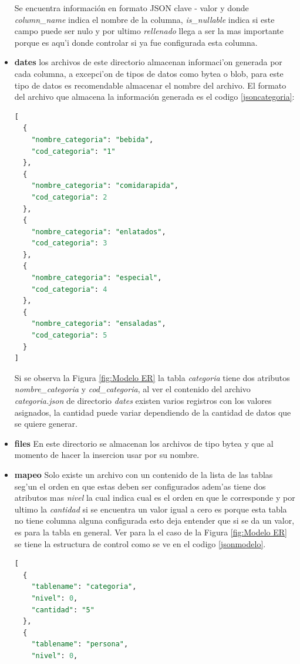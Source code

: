 \begin{itemize}
Se encuentra informaci\'on en formato JSON clave - valor y donde \textit{column\_name} indica el nombre de la columna, \textit{is\_nullable} indica si este campo puede ser nulo y por ultimo \textit{rellenado} llega a ser la mas importante porque es aqu'i donde controlar si ya fue configurada esta columna.
\item \textbf{dates} los archivos de este directorio almacenan informaci'on generada por cada columna, a excepci'on de tipos de datos como bytea o blob, para este tipo de datos es recomendable almacenar el nombre del archivo. El formato del archivo que almacena la informaci\'on generada es el codigo \ref{jsoncategoria}:
\begin{lstlisting}[caption={Ejemplo archivo control},label={jsoncategoria},language=sql]
[
  {
    "nombre_categoria": "bebida",
    "cod_categoria": "1"
  },
  {
    "nombre_categoria": "comidarapida",
    "cod_categoria": 2
  },
  {
    "nombre_categoria": "enlatados",
    "cod_categoria": 3
  },
  {
    "nombre_categoria": "especial",
    "cod_categoria": 4
  },
  {
    "nombre_categoria": "ensaladas",
    "cod_categoria": 5
  }
]
\end{lstlisting}
Si se observa la Figura \ref{fig:Modelo ER} la tabla \textit{categoria} tiene dos atributos \textit{nombre\_categoria} y \textit{cod\_categoria}, al ver el contenido del archivo \textit{categoria.json} de directorio \textit{dates} existen varios registros con los valores asignados, la cantidad puede variar dependiendo de la cantidad de datos que se quiere generar.
 \item \textbf{files} En este directorio se almacenan los archivos de tipo bytea y que al momento de hacer la insercion usar por su nombre.
 \item \textbf{mapeo} Solo existe un archivo con un contenido de la lista de las tablas seg'un el orden en que estas deben ser configurados adem'as tiene dos atributos mas \textit{nivel} la cual indica cual es el orden en que le corresponde y por ultimo la \textit{cantidad} si se encuentra un valor igual a cero es porque esta tabla no tiene columna alguna configurada esto deja entender que si se da un valor, es para la tabla en general. Ver para la el caso de la Figura \ref{fig:Modelo ER} se tiene la estructura de control como se ve en el codigo \ref{jsonmodelo}.
\begin{lstlisting}[caption={Ejemplo archivo control},label={jsonmodelo},language=sql]
[
  {
    "tablename": "categoria",
    "nivel": 0,
    "cantidad": "5"
  },
  {
    "tablename": "persona",
    "nivel": 0,

\end{lstlisting}
\end{itemize}
